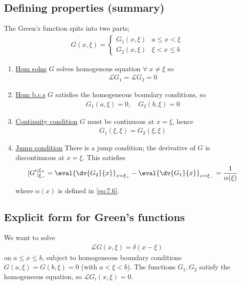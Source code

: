 \subsection{Defining properties (summary)}
The Green's function spits into two parts;
\begin{align} \label{eq:7.9}
	G(x,\xi) = \begin{cases}
		G_1(x,\xi) & a \leq x < \xi \\
		G_2(x,\xi) & \xi < x \leq b
	\end{cases}
\end{align}
\begin{enumerate}
    \item \underline{Hom solns} $G$ solves homogenous equation $\forall \; x \neq \xi$ so 
    \begin{align} \label{eq:7.10}
        \mathcal L G_1 = \mathcal L G_2 = 0
    \end{align} 
    \item \underline{Hom b.c.s} $G$ satisfies the homogeneous boundary conditions, so 
    \begin{align} \label{eq:7.11}
        G_1(a, \xi) = 0,\quad G_2(b, \xi) = 0
    \end{align} 
    \item \underline{Continuity condition} $G$ must be continuous at $x = \xi$, hence
    \begin{align} \label{eq:7.12}
        G_1(\xi, \xi) = G_2(\xi, \xi)
    \end{align} 
    \item \underline{Jump condition} There is a jump condition; the derivative of $G$ is discontinuous at $x = \xi$.
    This satisfies
    \begin{align} \label{eq:7.13}
        [G']_{\xi_-}^{\xi_+} = \eval{\dv{G_2}{x}}_{x = \xi_+} - \eval{\dv{G_1}{x}}_{x = \xi_-} = \frac{1}{\alpha(\xi)}
    \end{align}
    where $\alpha(x)$ is defined in \cref{eq:7.6}.
\end{enumerate} 

\subsection{Explicit form for Green's functions}
We want to solve
\begin{align*}
	\mathcal L G(x,\xi) = \delta(x-\xi)
\end{align*}
on $a \leq x \leq b$, subject to homogeneous boundary conditions $G(a,\xi) = G(b,\xi) = 0$ (with $a < \xi < b$).
The functions $G_1, G_2$ satisfy the homogeneous equation, so $\mathcal L G_i(x,\xi) = 0$.

